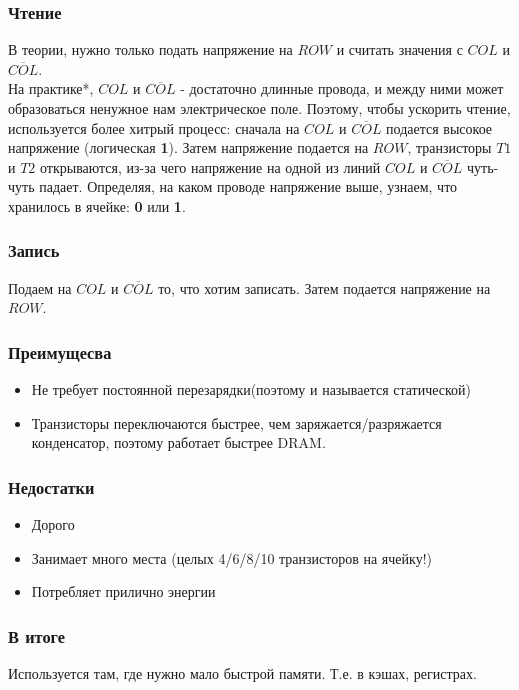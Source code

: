 \documentclass[12pt, a4paper]{article}
\begin{document}
\subsubsection{Чтение}
В теории, нужно только подать напряжение на $ROW$ и считать значения с $COL$ и $\overline{COL}$.\\
На практике*, $COL$ и $\overline{COL}$ - достаточно длинные провода, и между ними может образоваться ненужное нам электрическое поле. Поэтому, чтобы ускорить чтение, используется более хитрый процесс: сначала на $COL$ и $\overline{COL}$ подается высокое напряжение (логическая \textbf{1}). Затем напряжение подается на $ROW$, транзисторы $T1$ и $T2$ открываются, из-за чего напряжение на одной из линий $COL$ и $\overline{COL}$ чуть-чуть падает. Определяя, на каком проводе напряжение выше, узнаем, что хранилось в ячейке: \textbf{0} или \textbf{1}.
\subsubsection{Запись}
Подаем на $COL$ и $\overline{COL}$ то, что хотим записать. Затем подается напряжение на $ROW$.
\subsubsection{Преимущесва}
\begin{itemize}
    \item Не требует постоянной перезарядки(поэтому и называется статической)
    \item Транзисторы переключаются быстрее, чем заряжается/разряжается конденсатор, поэтому работает быстрее DRAM.
\end{itemize}
\subsubsection{Недостатки}
\begin{itemize}
    \item Дорого
    \item Занимает много места (целых 4/6/8/10 транзисторов на ячейку!)
    \item Потребляет прилично энергии
\end{itemize}
\subsubsection{В итоге}
Используется там, где нужно мало быстрой памяти. Т.е. в кэшах, регистрах.
\end{document}
